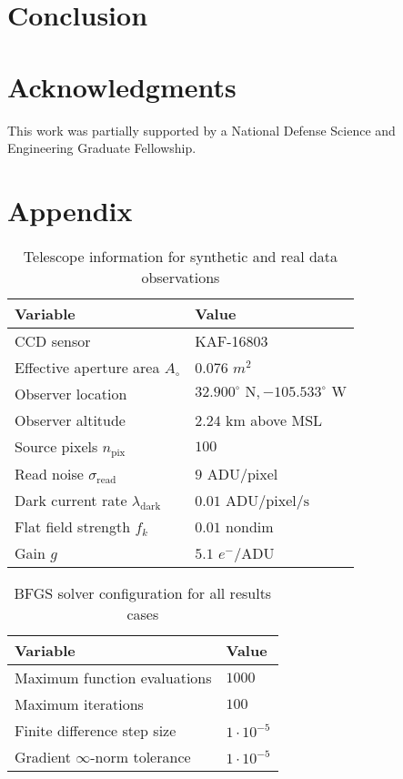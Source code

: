 \documentclass[a4paper,twocolumn]{spaceDebrisC} %
\begin{document}
\section{Conclusion}



\section*{Acknowledgments}

This work was partially supported by a National Defense Science and Engineering Graduate Fellowship.

\section*{Appendix}

\begin{table}[H]
  \centering
  \caption{Telescope information for synthetic and real data observations}
  \vspace*{6pt}
  \begin{tabular}{|l|l|}
  \hline
  \textbf{Variable} & \textbf{Value} \\ \hline
 CCD sensor & KAF-16803 \\ \hline
 Effective aperture area $A_\circ$ & $0.076$ $m^2$ \\ \hline
 Observer location & $32.900^\circ \textrm{ N}, -105.533^\circ \textrm{ W}$ \\ \hline
 Observer altitude & $2.24$ km above MSL \\ \hline
 Source pixels $n_\text{pix}$ & $100$ \\ \hline
 Read noise $\sigma_\text{read}$ & $9$ $\text{ADU} / \text{pixel}$ \\ \hline
 Dark current rate $\lambda_\text{dark}$ & $0.01$ $\text{ADU} / \text{pixel} / \text{s}$ \\ \hline
 Flat field strength $f_k$ & $0.01$ nondim \\ \hline
 Gain $g$ & $5.1$ $e^- / \text{ADU}$ \\ \hline
  \end{tabular}
  \label{tb:tele_info}
 \end{table}

 \begin{table}[H]
  \centering
  \caption{BFGS solver configuration for all results cases}
  \vspace*{6pt}
  \begin{tabular}{|l|l|}
  \hline
  \textbf{Variable} & \textbf{Value} \\ \hline
 Maximum function evaluations & $1000$ \\ \hline
 Maximum iterations & $100$ \\ \hline
 Finite difference step size & $1 \cdot 10^{-5}$ \\ \hline
 Gradient $\infty$-norm tolerance & $1 \cdot 10^{-5}$ \\ \hline
  \end{tabular}
  \label{tb:bfgs_info}
 \end{table}


\end{document}
